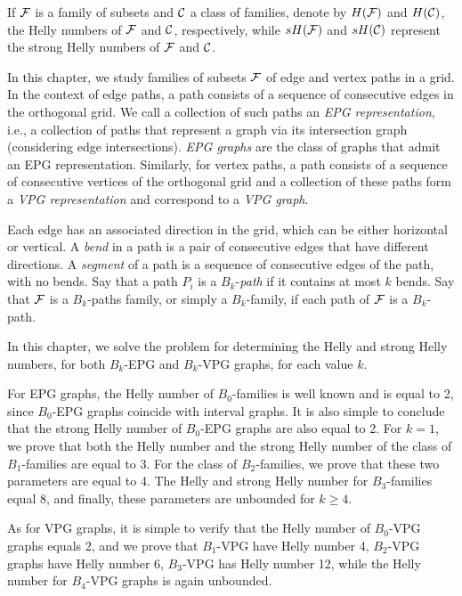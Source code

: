 If $\cal F$ is a family of subsets and $\cal C$ a class of families, denote by $H(\cal F)$ and 
$H(\cal C)$,  the Helly numbers of $\cal F$ and $\cal C$, respectively, while  $sH({\cal F})$ and $sH({\cal C})$  represent the strong Helly numbers of $\cal F$ and $\cal C$.


In this chapter, we study families of subsets $\cal{F}$ of edge and vertex paths in a grid. In the context of edge paths, a path consists of a sequence of consecutive edges in the orthogonal grid. We call a collection of such paths an {\it EPG representation}, i.e., a collection of paths that represent a graph via its intersection graph (considering edge intersections). {\it EPG graphs} are the class of graphs that admit an EPG representation.
Similarly, for vertex paths, a path consists of a sequence of consecutive vertices of the orthogonal grid and a collection of
these paths form a {\it VPG representation} and correspond to a {\it VPG graph}. 

Each edge has an associated direction in the grid, which can be either horizontal or vertical. A {\it bend} in a path is a pair of consecutive edges that have different directions. A {\it segment} of a path is a sequence of consecutive edges of the path, with no bends. Say that a path $P_i$ is a $B_k$-{\it path} if it contains at most $k$ bends. Say that $\cal {F}$ is a  $B_k$-paths family, or simply a $B_k$-family,  if each path of $\cal {F}$ is a $B_k$-path. 

 In this chapter, we solve the problem for determining the Helly and strong Helly numbers, for both $B_k$-EPG and $B_k$-VPG graphs, for each value $k$.

For EPG graphs,  the Helly number of  $B_0$-families is well known and is equal to 2, since $B_0$-EPG graphs coincide with interval graphs. It is also simple to conclude that the strong Helly number of $B_0$-EPG graphs are also equal to 2. For $k = 1$,  
we prove that both the Helly number and the strong Helly number of the class of $B_1$-families are equal to 3. For the class of $B_2$-families, we prove that these two parameters are equal to 4. The Helly and strong Helly number for $B_3$-families equal 8, and finally, these parameters are unbounded for $k \geq 4$. 

As for VPG graphs, it is simple to verify that the Helly number of $B_0$-VPG graphs equals 2, and we prove that $B_1$-VPG have Helly number 4, $B_2$-VPG graphs have Helly number 6, $B_3$-VPG has Helly number 12, while the Helly number for $B_4$-VPG graphs is again unbounded. 

